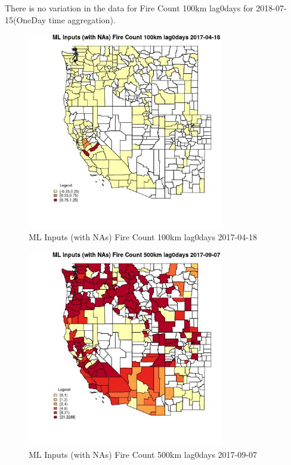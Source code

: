 There is no variation in the data for Fire Count 100km lag0days for 2018-07-15(OneDay time aggregation). 
 

\begin{figure} 
\centering  
\includegraphics[width=0.77\textwidth]{Code_Outputs/Report_ML_input_PM25_Step4_part_e_de_duplicated_aves_compiled_2019-05-21wNAs_CountyFire_Count_100km_lag0daysMean2017-04-18.jpg} 
\caption{\label{fig:Report_ML_input_PM25_Step4_part_e_de_duplicated_aves_compiled_2019-05-21wNAsCountyFire_Count_100km_lag0daysMean2017-04-18}ML Inputs (with NAs) Fire Count 100km lag0days 2017-04-18} 
\end{figure} 
 

\begin{figure} 
\centering  
\includegraphics[width=0.77\textwidth]{Code_Outputs/Report_ML_input_PM25_Step4_part_e_de_duplicated_aves_compiled_2019-05-21wNAs_CountyFire_Count_500km_lag0daysMean2017-09-07.jpg} 
\caption{\label{fig:Report_ML_input_PM25_Step4_part_e_de_duplicated_aves_compiled_2019-05-21wNAsCountyFire_Count_500km_lag0daysMean2017-09-07}ML Inputs (with NAs) Fire Count 500km lag0days 2017-09-07} 
\end{figure} 
 

